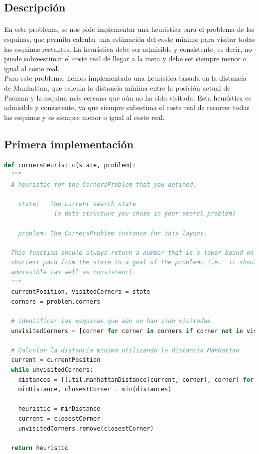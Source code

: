 \documentclass{report}
\begin{document}
        \subsection*{Descripción}
          \paragraph*{}{
            En este problema, se nos pide implementar una heurística para el problema de las esquinas, que permita calcular una estimación del coste mínimo para visitar todas las esquinas restantes. La heurística debe ser admisible y consistente, es decir, no puede sobreestimar el coste real de llegar a la meta y debe ser siempre menor o igual al coste real.\\
            Para este problema, hemos implementado una heurística basada en la distancia de Manhattan, que calcula la distancia mínima entre la posición actual de Pacman y la esquina más cercana que aún no ha sido visitada. Esta heurística es admisible y consistente, ya que siempre subestima el coste real de recorrer todas las esquinas y es siempre menor o igual al coste real.\\
          }
        \subsection*{Primera implementación}
          \begin{lstlisting}[language=Python, caption=Implementación inicial de la heurística del problema de las esquinas]
def cornersHeuristic(state, problem):
  """
  A heuristic for the CornersProblem that you defined.

    state:   The current search state
              (a data structure you chose in your search problem)

    problem: The CornersProblem instance for this layout.

  This function should always return a number that is a lower bound on the
  shortest path from the state to a goal of the problem; i.e.  it should be
  admissible (as well as consistent).
  """
  currentPosition, visitedCorners = state
  corners = problem.corners

  # Identificar las esquinas que aún no han sido visitadas
  unvisitedCorners = [corner for corner in corners if corner not in visitedCorners]

  # Calcular la distancia mínima utilizando la distancia Manhattan
  current = currentPosition
  while unvisitedCorners:
    distances = [(util.manhattanDistance(current, corner), corner) for corner in unvisitedCorners]
    minDistance, closestCorner = min(distances)

    heuristic = minDistance
    current = closestCorner
    unvisitedCorners.remove(closestCorner)

  return heuristic
          \end{lstlisting}
\end{document}
